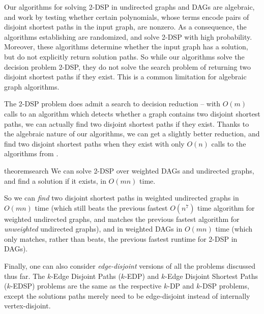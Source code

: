 \documentclass[11pt]{article}
\theoremstyle{definition}
\begin{document}
Our algorithms for solving \textsf{2-DSP} in undirected graphs and DAGs are algebraic, and work by testing whether certain polynomials, whose terms encode pairs of disjoint shortest paths in the input graph, are nonzero.
As a consequence, the algorithms establishing  are randomized, and solve \textsf{2-DSP} with high probability.
Moreover, these algorithms determine whether the input graph has a solution, but do not explicitly return solution paths.
So while our algorithms solve the decision problem \textsf{2-DSP}, they do not solve the search problem of returning two disjoint shortest paths if they exist.
This is a common limitation for algebraic graph algorithms.

The \textsf{2-DSP} problem does admit a search to decision reduction -- with $O(m)$ calls to an algorithm which detects whether a graph contains two disjoint shortest paths, we can actually find two disjoint shortest paths if they exist.
Thanks to the algebraic nature of our algorithms, we can get a slightly better reduction, and find two disjoint shortest paths when they exist with only $O(n)$ calls to the algorithms from .

\begin{restatable}{theorem}{search}
    \label{thm:search}
    We can solve \textsf{2-DSP} over weighted DAGs and undirected graphs, and find a solution if it exists, in $O(mn)$ time.
\end{restatable}

So we can \emph{find} two disjoint shortest paths in weighted undirected graphs in $O(mn)$ time (which still beats the previous fastest $O(n^7)$ time algorithm for weighted undirected graphs, and matches the previous fastest algorithm for \emph{unweighted} undirected graphs), and in weighted DAGs in $O(mn)$ time (which only matches, rather than beats, the previous fastest runtime for \textsf{2-DSP} in DAGs).


Finally, one can also consider \emph{edge-disjoint} versions of all the problems discussed thus far.
The \textsf{$k$-Edge Disjoint Paths ($k$-EDP)} and \textsf{$k$-Edge Disjoint Shortest Paths ($k$-EDSP)} problems are the same as the respective \textsf{$k$-DP} and \textsf{$k$-DSP} problems, except the solutions paths merely need to be edge-disjoint instead of internally vertex-disjoint. 
\end{document}
